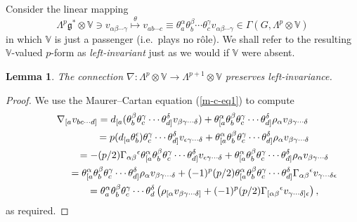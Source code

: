 \documentclass[11pt]{article}
\newtheorem{lemma}{Lemma}
\begin{document}
Consider the linear mapping
\[\Lambda^p{\mathfrak{g}}^*\otimes{\mathbb{V}}\ni v_{\alpha\beta\cdots\gamma}
\stackrel{\theta}{\longmapsto}v_{ab\cdots c}\equiv
\theta_a^\alpha\theta_b^\beta\cdots\theta_c^\gamma
v_{\alpha\beta\cdots\gamma}\in\Gamma(G,\Lambda^p\otimes{\mathbb{V}})\]
in which ${\mathbb{V}}$ is just a passenger (i.e.~plays no r\^{o}le). We shall
refer to the resulting ${\mathbb{V}}$-valued $p$-form as {\em left-invariant\/}
just as we would if ${\mathbb{V}}$ were absent.
\begin{lemma} The connection
$\nabla:\Lambda^p\otimes{\mathbb{V}}\to\Lambda^{p+1}\otimes{\mathbb{V}}$
preserves left-invariance.\end{lemma}
\begin{proof}We use the Maurer--Cartan equation (\ref{m-c-eq1}) to compute
\begin{gather}
\nabla_{[a}v_{bc\cdots d]} =d_{[a}(\theta_b^\beta\theta_c^\gamma\cdots\theta_{d]}^\delta
v_{\beta\gamma\cdots\delta})+
\theta_{[a}^\alpha\theta_b^\beta\theta_c^\gamma\cdots\theta_{d]}^\delta
\rho_\alpha v_{\beta\gamma\cdots\delta}
\nonumber\\
 \hphantom{\nabla_{[a}v_{bc\cdots d]}}{} = p(d_{[a}\theta_b^\epsilon)\theta_c^\gamma\cdots\theta_{d]}^\delta
v_{\epsilon\gamma\cdots\delta}+
\theta_{[a}^\alpha\theta_b^\beta\theta_c^\gamma\cdots\theta_{d]}^\delta
\rho_\alpha v_{\beta\gamma\cdots\delta}
\nonumber\\
 \hphantom{\nabla_{[a}v_{bc\cdots d]}}{} =-(p/2)\Gamma_{\alpha\beta}{}^\epsilon
\theta_{[a}^\alpha\theta_b^\beta\theta_c^\gamma\cdots\theta_{d]}^\delta
v_{\epsilon\gamma\cdots\delta}+
\theta_{[a}^\alpha\theta_b^\beta\theta_c^\gamma\cdots\theta_{d]}^\delta
\rho_\alpha v_{\beta\gamma\cdots\delta}
\nonumber\\
 \hphantom{\nabla_{[a}v_{bc\cdots d]}}{} =\theta_{[a}^\alpha\theta_b^\beta\theta_c^\gamma\cdots\theta_{d]}^\delta
\rho_\alpha v_{\beta\gamma\cdots\delta}
+(-1)^p(p/2)
\theta_{[a}^\alpha\theta_b^\beta\theta_c^\gamma\cdots\theta_{d]}^\delta
\Gamma_{\alpha\beta}{}^\epsilon v_{\gamma\cdots\delta\epsilon}
\nonumber\\
 \hphantom{\nabla_{[a}v_{bc\cdots d]}}{} = \theta_a^\alpha\theta_b^\beta\theta_c^\gamma\cdots\theta_d^\delta
\left(\rho_{[\alpha}v_{\beta\gamma\cdots\delta]}
+(-1)^p(p/2)
\Gamma_{[\alpha\beta}{}^\epsilon v_{\gamma\cdots\delta]\epsilon}\right),\label{key}
\end{gather}
as required.
\end{proof}
\end{document}
